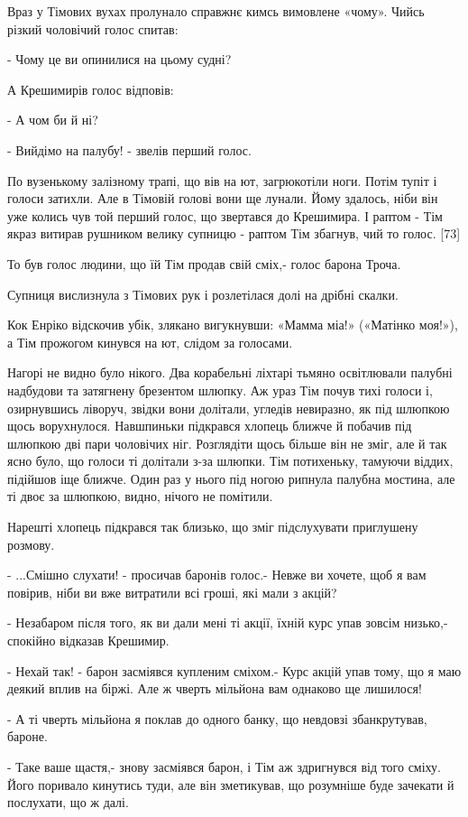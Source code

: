 Враз у Тімових вухах пролунало справжнє кимсь вимовлене «чому». Чийсь різкий чоловічий голос спитав:

- Чому це ви опинилися на цьому судні?

А Крешимирів голос відповів:

- А чом би й ні?

- Вийдімо на палубу! - звелів перший голос.

По вузенькому залізному трапі, що вів на ют, загрюкотіли ноги. Потім тупіт і голоси затихли. Але в Тімовій голові вони ще лунали. Йому здалось, ніби він уже колись чув той перший голос, що звертався до Крешимира. І раптом - Тім якраз витирав рушником велику супницю - раптом Тім збагнув, чий то голос. [73]

То був голос людини, що їй Тім продав свій сміх,- голос барона Троча.

Супниця вислизнула з Тімових рук і розлетілася долі на дрібні скалки.

Кок Енріко відскочив убік, злякано вигукнувши: «Мамма міа!» («Матінко моя!»), а Тім прожогом кинувся на ют, слідом за голосами.

Нагорі не видно було нікого. Два корабельні ліхтарі тьмяно освітлювали палубні надбудови та затягнену брезентом шлюпку. Аж ураз Тім почув тихі голоси і, озирнувшись ліворуч, звідки вони долітали, угледів невиразно, як під шлюпкою щось ворухнулося. Навшпиньки підкрався хлопець ближче й побачив під шлюпкою дві пари чоловічих ніг. Розглядіти щось більше він не зміг, але й так ясно було, що голоси ті долітали з-за шлюпки. Тім потихеньку, тамуючи віддих, підійшов іще ближче. Один раз у нього під ногою рипнула палубна мостина, але ті двоє за шлюпкою, видно, нічого не помітили.

Нарешті хлопець підкрався так близько, що зміг підслухувати приглушену розмову.

- ...Смішно слухати! - просичав баронів голос.- Невже ви хочете, щоб я вам повірив, ніби ви вже витратили всі гроші, які мали з акцій?

- Незабаром після того, як ви дали мені ті акції, їхній курс упав зовсім низько,- спокійно відказав Крешимир.

- Нехай так! - барон засміявся купленим сміхом.- Курс акцій упав тому, що я маю деякий вплив на біржі. Але ж чверть мільйона вам однаково ще лишилося!

- А ті чверть мільйона я поклав до одного банку, що невдовзі збанкрутував, бароне.

- Таке ваше щастя,- знову засміявся барон, і Тім аж здригнувся від того сміху. Його поривало кинутись туди, але він зметикував, що розумніше буде зачекати й послухати, що ж далі.

